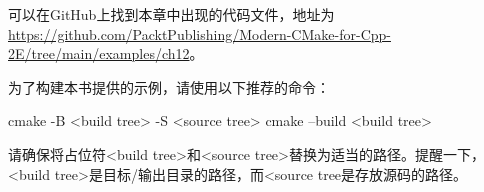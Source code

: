 可以在GitHub上找到本章中出现的代码文件，地址为 \url{https://github.com/PacktPublishing/Modern-CMake-for-Cpp-2E/tree/main/examples/ch12}。

为了构建本书提供的示例，请使用以下推荐的命令：

\begin{shell}
cmake -B <build tree> -S <source tree>
cmake --build <build tree>
\end{shell}

请确保将占位符<build tree>和<source tree>替换为适当的路径。提醒一下，<build tree>是目标/输出目录的路径，而<source tree是存放源码的路径。


